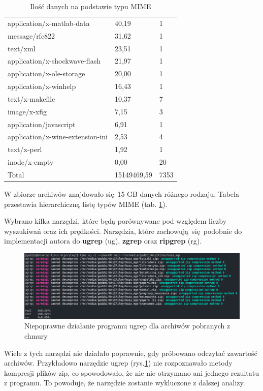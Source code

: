 \begin{table}[p]
\begin{tabular}{|l|l|l|}
application/x-matlab-data & 40,19 & 1 \\
message/rfc822 & 31,62 & 1 \\
text/xml & 23,51 & 1 \\
application/x-shockwave-flash & 21,97 & 1 \\
application/x-ole-storage & 20,00 & 1 \\
application/x-winhelp & 16,43 & 1 \\
text/x-makefile & 10,37 & 7 \\
image/x-xfig & 7,15 & 3 \\
application/javascript & 6,91 & 1 \\
application/x-wine-extension-ini & 2,53 & 4 \\
text/x-perl & 1,92 & 1 \\
inode/x-empty & 0,00 & 20 \\
        \hline
Total & 15149469,59 & 7353 \\
        \hline
    \end{tabular}
    \caption{Ilość danych na podstawie typu MIME}
    \label{tabela:typy-MIME-z-iloscia}
\end{table}

W zbiorze archiwów znajdowało się 15 GB danych różnego rodzaju. Tabela 
przestawia hierarchiczną listę typów MIME (tab. \ref{tabela:typy-MIME-z-iloscia}).

Wybrano kilka narzędzi, które będą porównywane pod względem liczby wyszukiwań
oraz ich prędkości. Narzędzia, które zachowują się podobnie do implementacji
autora do \textbf{ugrep} (ug), \textbf{zgrep} oraz \textbf{ripgrep} (rg). 

\begin{figure}[htbp]
\centering
\includegraphics[width=1\textwidth]{./images/ugrep-errors.png}
\caption{Niepoprawne działanie programu ugrep dla archiwów pobranych z chmury}
\label{fig:ugrepErrors}
\end{figure}

Wiele z tych narzędzi nie działało poprawnie, gdy próbowano odczytać zawartość
archiwów. Przykładowo narzędzie ugrep (rys.\ref{fig:ugrepErrors}) nie rozpoznawało 
metody kompresji plików zip, co spowodowało, że nie nie otrzymano ani 
jednego rezultatu z programu. To powoduje, że narzędzie zostanie wykluczone z 
dalszej analizy.

